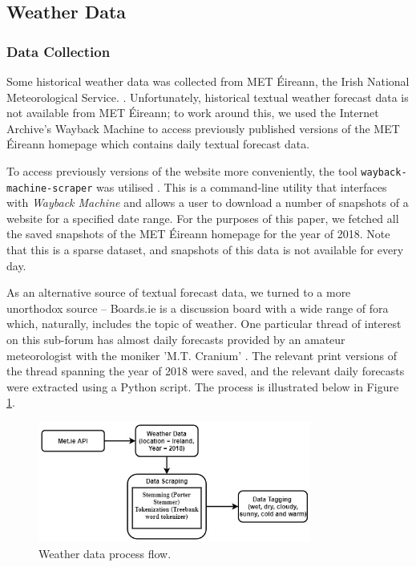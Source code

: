\documentclass[a4paper,10pt]{article}
\begin{document}
    \subsection{Weather Data}

    \subsubsection{Data Collection}

    Some historical weather data was collected from MET \'{E}ireann, the Irish National Meteorological Service. . Unfortunately, historical textual weather forecast data is not available from MET \'{E}ireann; to work around this, we used the Internet Archive's Wayback Machine  to access previously published versions of the MET \'{E}ireann homepage which contains daily textual forecast data.

    To access previously versions of the website more conveniently, the tool \texttt{wayback-machine-scraper} was utilised . This is a command-line utility that interfaces with \textit{Wayback Machine} and allows a user to download a number of snapshots of a website for a specified date range. For the purposes of this paper, we fetched all the saved snapshots of the MET \'{E}ireann homepage for the year of 2018. Note that this is a sparse dataset, and snapshots of this data is not available for every day.

    As an alternative source of textual forecast data, we turned to a more unorthodox source -- Boards.ie is a discussion board with a wide range of fora which, naturally, includes the topic of weather. One particular thread of interest on this sub-forum has almost daily forecasts provided by an amateur meteorologist with the moniker 'M.T. Cranium' . The relevant print versions of the thread spanning the year of 2018 were saved, and the relevant daily forecasts were extracted using a Python script. The process is illustrated below in Figure \ref{fig:weather_process_flow}.

    \begin{figure}
        \includegraphics[width=0.8\textwidth]{weather_process_flow.jpeg}
        \caption{Weather data process flow.}
        \label{fig:weather_process_flow}
    \end{figure}
\end{document}
